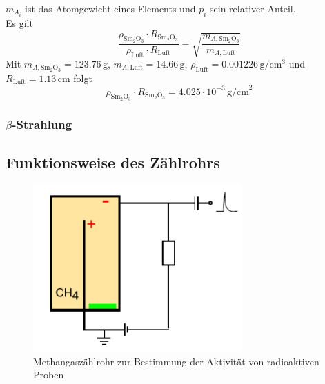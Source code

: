 ${m_{A_i}}$ ist das Atomgewicht eines Elements und $p_i$ sein relativer Anteil.\\
Es gilt
\begin{equation}
  \frac{\rho_{\text{Sm}_2\text{O}_3} \cdot R_{\text{Sm}_2\text{O}_3}} {\rho_{\text{Luft}} \cdot R_{\text{Luft}}}
  =\sqrt{\frac{m_{A,\text{Sm}_2\text{O}_3}}{m_{A,\text{Luft}}}}
\end{equation}
Mit $m_{A,\text{Sm}_2\text{O}_3} = 123.76 \, \text{g}$, $m_{A,\text{Luft}} =14.66\, \text{g}$,
$\rho_{\text{Luft}} = 0.001226\,\text{g} / \text{cm}^3$ und 
$R_{\text{Luft}} = 1.13$\,cm folgt
\begin{equation}
\label{eq:samarium:Rrho}
  \rho_{\text{Sm}_2\text{O}_3} \cdot R_{\text{Sm}_2\text{O}_3} =
  4.025 \cdot 10^{-3} \, \text{g/cm}^2
\end{equation}


\subsubsection{$\beta$-Strahlung}

\subsection{Funktionsweise des Zählrohrs}

\begin{figure}[H]
\begin{center}
  \includegraphics[width=8cm]{../img/aufbau}
  \caption{Methangaszählrohr zur Bestimmung der Aktivität von radioaktiven Proben}
  \label{img:aufbau}
\end{center}
\end{figure}

